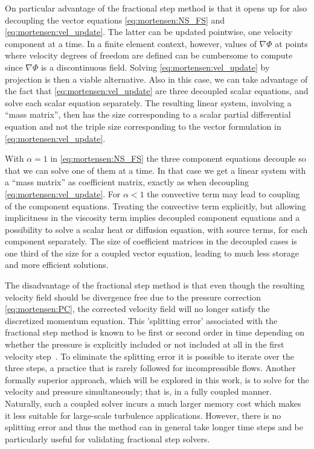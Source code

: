 On particular advantage of the fractional step method is that it opens
up for also decoupling the vector equations
\eqref{eq:mortensen:NS_FS} and
\eqref{eq:mortensen:vel_update}. The latter can be updated
pointwise, one velocity component at a time. In a finite element
context, however, values of $\nabla\Phi$ at points where velocity
degrees of freedom are defined can be cumbersome to compute since
$\nabla\Phi$ is a discontinuous field. Solving
\eqref{eq:mortensen:vel_update} by projection is then a viable
alternative. Also in this case, we can take advantage of the fact that
\eqref{eq:mortensen:vel_update} are three decoupled scalar
equations, and solve each scalar equation separately.  The resulting
linear system, involving a ``mass matrix'', then has the size
corresponding to a scalar partial differential equation and not the
triple size corresponding to the vector formulation in
\eqref{eq:mortensen:vel_update}.

With $\alpha =1$ in \eqref{eq:mortensen:NS_FS} the three component
equations decouple so that we can solve one of them at a time. In that
case we get a linear system with a ``mass matrix'' as coefficient
matrix, exactly as when decoupling \eqref{eq:mortensen:vel_update}.
For $\alpha <1$ the convective term may lead to coupling of the
component equations. Treating the convective term explicitly, but
allowing implicitness in the viscosity term implies decoupled
component equations and a possibility to solve a scalar heat or
diffusion equation, with source terms, for each component separately.
The size of coefficient matrices in the decoupled cases is one third
of the size for a coupled vector equation, leading to much less
storage and more efficient solutions.

The disadvantage of the fractional step method is that even though the
resulting velocity field should be divergence free due to the pressure
correction \eqref{eq:mortensen:PC}, the corrected velocity field
will no longer satisfy the discretized momentum equation. This
'splitting error' associated with the fractional step method is known
to be first or second order in time depending on whether the pressure
is explicitly included or not included at all in the first velocity
step~\citep{GuermondMinevShen2006}. To eliminate the splitting error it
is possible to iterate over the three steps, a practice that is rarely
followed for incompressible flows. Another formally superior approach,
which will be explored in this work, is to solve for the velocity and
pressure simultaneously; that is, in a fully coupled manner.  Naturally,
such a coupled solver incurs a much larger memory cost which makes it
less suitable for large-scale turbulence applications. However, there
is no splitting error and thus the method can in general take longer
time steps and be particularly useful for validating fractional step
solvers.

